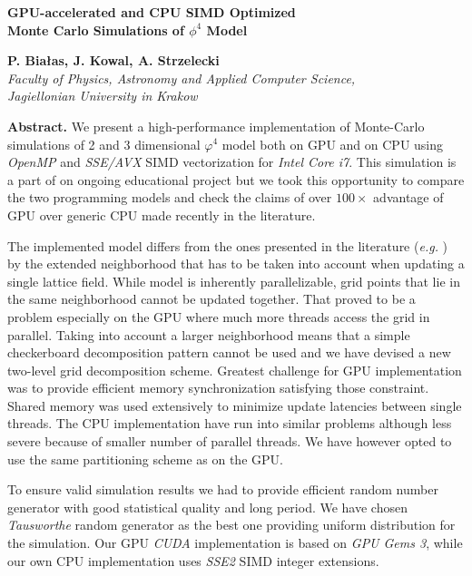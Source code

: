 \documentclass[11pt,a4paper]{article}
\begin{document}
\begin{samepage}
\begin{center}
{\Large{\bf GPU-accelerated and CPU SIMD Optimized \\ Monte Carlo Simulations of $\phi^4$ Model }}

\vspace {5mm}
{\bf P. Białas, J. Kowal, A. Strzelecki}\\
{\em Faculty of Physics, Astronomy and Applied Computer Science, \\ Jagiellonian University in Krakow }\\

\end{center}
\end{samepage}

{\bf Abstract.}  We present a high-performance implementation of
Monte-Carlo simulations of 2 and 3 dimensional $\varphi^4$ model
both on GPU and on CPU using \emph{OpenMP} and \emph{SSE/AVX} SIMD
vectorization for \emph{Intel Core i7}. This simulation is a part of
on ongoing educational project but we took this opportunity to compare
the two programming models and check the claims of over $100\times$
advantage of GPU over generic CPU made recently in the literature.

The implemented model differs from the ones presented in the
literature ({\em e.g.} \cite{Preis20094468}) by the extended
neighborhood that has to be taken into account when updating a single
lattice field. While model is inherently parallelizable, grid points
that lie in the same neighborhood cannot be updated together. That
proved to be a problem especially on the GPU where much more threads
access the grid in parallel.  Taking into account a larger
neighborhood means that a simple checkerboard decomposition pattern
cannot be used and we have devised a new two-level grid decomposition
scheme.  Greatest challenge for GPU implementation was to provide
efficient memory synchronization satisfying those constraint.  Shared
memory was used extensively to minimize update latencies between
single threads.  The CPU implementation have run into similar problems
although less severe because of smaller number of parallel
threads. We have however opted to use the same partitioning scheme as
on the GPU.

To ensure valid simulation results we had to provide efficient random
number generator with good statistical quality and long period. We
have chosen \emph{Tausworthe} random generator\cite{LEcuyer96} as the
best one providing uniform distribution for the simulation. Our GPU
\emph{CUDA} implementation is based on \emph{GPU Gems
  3}\cite{howes_thomas07}, while our own CPU implementation uses
\emph{SSE2} SIMD integer extensions.
\end{document}
